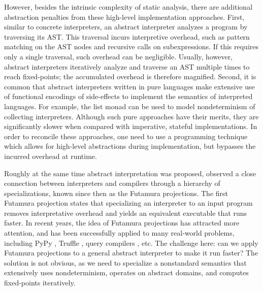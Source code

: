 However, besides the intrinsic complexity of static analysis, there are
additional abstraction penalties from these high-level implementation
approaches. First, similar to concrete interpreters, an abstract interpreter
analyzes a program by traversing its AST. This traversal incurs interpretive
overhead, such as pattern matching on the AST nodes and recursive calls on
subexpressions. If this requires only a single traversal, such overhead can be
negligible. Usually, however, abstract interpreters iteratively analyze and
traverse an AST multiple times to reach fixed-points; the accumulated overhead
is therefore magnified.
Second, it is common that abstract interpreters written in pure languages make
extensive use of functional encodings of side-effects to implement the semantics
of interpreted languages. For example, the list monad can be used to model
nondeterminism of collecting interpreters. Although such pure approaches have
their merits, they are significantly slower when compared with imperative,
stateful implementations.  In order to reconcile these approaches, one need to
use a programming technique which allows for high-level abstractions during
implementation, but bypasses the incurred overhead at runtime.

Roughly at the same time abstract interpretation was proposed,
\citet{futamura1971partial} observed a close connection between interpreters and
compilers through a hierarchy of specializations, known since then as the
Futamura projections. The first Futamura projection states that specializing an
interpreter to an input program removes interpretative overhead and yields an
equivalent executable that runs faster. In recent years, the idea of Futamura
projections has attracted more attention, and has been successfully applied to
many real-world problems, including PyPy \cite{Bolz:2009:TMP:1565824.1565827},
Truffle \cite{Marr:2015:TVP:2814270.2814275}, query compilers
\cite{DBLP:conf/sigmod/TahboubER18}, etc. The challenge here: can we apply
Futamura projections to a general abstract interpreter to make it run faster?
The solution is not obvious, as we need to specialize a nonstandard semantics
that extensively uses nondeterminism, operates on abstract domains, and
computes fixed-points iteratively. 

